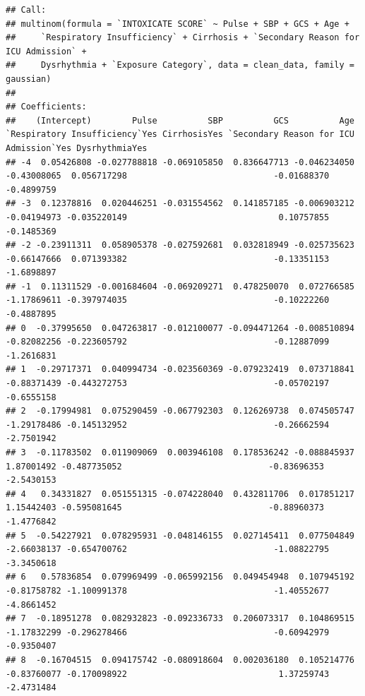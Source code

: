 \documentclass[
]{article}
\begin{document}
\begin{verbatim}
## Call:
## multinom(formula = `INTOXICATE SCORE` ~ Pulse + SBP + GCS + Age + 
##     `Respiratory Insufficiency` + Cirrhosis + `Secondary Reason for ICU Admission` + 
##     Dysrhythmia + `Exposure Category`, data = clean_data, family = gaussian)
## 
## Coefficients:
##    (Intercept)        Pulse          SBP          GCS          Age `Respiratory Insufficiency`Yes CirrhosisYes `Secondary Reason for ICU Admission`Yes DysrhythmiaYes
## -4  0.05426808 -0.027788818 -0.069105850  0.836647713 -0.046234050                    -0.43008065  0.056717298                             -0.01688370     -0.4899759
## -3  0.12378816  0.020446251 -0.031554562  0.141857185 -0.006903212                    -0.04194973 -0.035220149                              0.10757855     -0.1485369
## -2 -0.23911311  0.058905378 -0.027592681  0.032818949 -0.025735623                    -0.66147666  0.071393382                             -0.13351153     -1.6898897
## -1  0.11311529 -0.001684604 -0.069209271  0.478250070  0.072766585                    -1.17869611 -0.397974035                             -0.10222260     -0.4887895
## 0  -0.37995650  0.047263817 -0.012100077 -0.094471264 -0.008510894                    -0.82082256 -0.223605792                             -0.12887099     -1.2616831
## 1  -0.29717371  0.040994734 -0.023560369 -0.079232419  0.073718841                    -0.88371439 -0.443272753                             -0.05702197     -0.6555158
## 2  -0.17994981  0.075290459 -0.067792303  0.126269738  0.074505747                    -1.29178486 -0.145132952                             -0.26662594     -2.7501942
## 3  -0.11783502  0.011909069  0.003946108  0.178536242 -0.088845937                     1.87001492 -0.487735052                             -0.83696353     -2.5430153
## 4   0.34331827  0.051551315 -0.074228040  0.432811706  0.017851217                     1.15442403 -0.595081645                             -0.88960373     -1.4776842
## 5  -0.54227921  0.078295931 -0.048146155  0.027145411  0.077504849                    -2.66038137 -0.654700762                             -1.08822795     -3.3450618
## 6   0.57836854  0.079969499 -0.065992156  0.049454948  0.107945192                    -0.81758782 -1.100991378                             -1.40552677     -4.8661452
## 7  -0.18951278  0.082932823 -0.092336733  0.206073317  0.104869515                    -1.17832299 -0.296278466                             -0.60942979     -0.9350407
## 8  -0.16704515  0.094175742 -0.080918604  0.002036180  0.105214776                    -0.83760077 -0.170098922                              1.37259743     -2.4731484

\end{verbatim}
\end{document}
